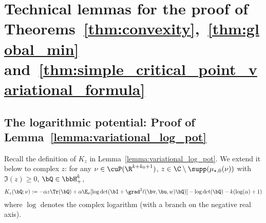 \section{Technical lemmas for the proof of Theorems~\ref{thm:convexity},~\ref{thm:global_min} and~\ref{thm:simple_critical_point_variational_formula}}





\subsection{The logarithmic potential: Proof of Lemma~\ref{lemma:variational_log_pot}}
\label{sec:log_pot_proof}
Recall the definition of $K_z$ in Lemma~\ref{lemma:variational_log_pot}. We extend it below to complex $z$:
for any $\nu\in\cuP(\R^{k+k_0+1})$, $z \in \C \setminus \supp(\mu_{\star,0}(\nu))$ 
with $\Im(z) \ge 0$, $\bQ\in\bbH_+^k$,
\begin{equation}
    K_z(\bQ;\nu):= -\alpha z \Tr(\bQ) + \alpha \E_{\nu}[\log\det(\bI + \grad^2 \ell(\bv,\bu, w)\bQ) ]  - \log\det(\bQ) - k (\log(\alpha) + 1)
\end{equation}
where $\log$ denotes the complex logarithm (with a branch on the negative real axis). 

